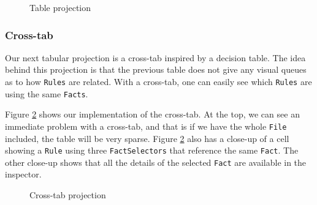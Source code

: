 \begin{figure}
    \centering
    \caption{Table projection}
    \label{fig:tableProjection1}
\end{figure}

\subsubsection{Cross-tab}
Our next tabular projection is a cross-tab inspired by a decision table.
The idea behind this projection is that the previous table does not give any visual queues as to how \texttt{Rules} are related.
With a cross-tab, one can easily see which \texttt{Rules} are using the same \texttt{Facts}.

Figure \ref{fig:crosstabProjection1} shows our implementation of the cross-tab.
At the top, we can see an immediate problem with a cross-tab, and that is if we have the whole \texttt{File} included, the table will be very sparse.
Figure \ref{fig:crosstabProjection1} also has a close-up of a cell showing a \texttt{Rule} using three \texttt{FactSelectors} that reference the same \texttt{Fact}.
The other close-up shows that all the details of the selected \texttt{Fact} are available in the inspector.

\begin{figure}
    \centering
    \caption{Cross-tab projection}
    \label{fig:crosstabProjection1}
\end{figure}

